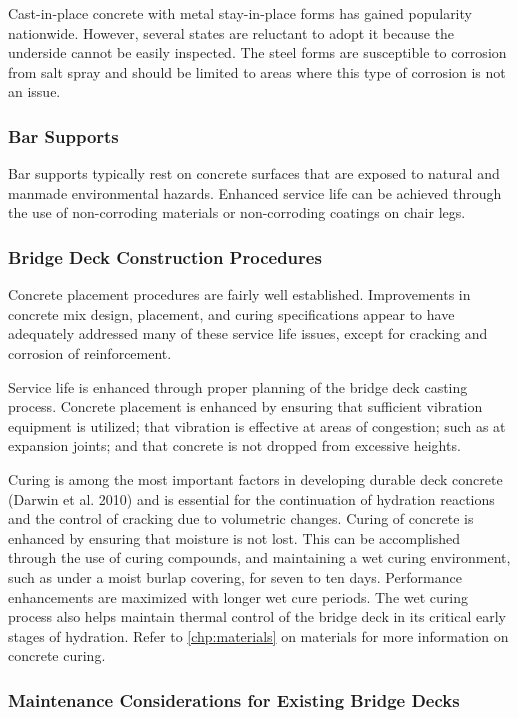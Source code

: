Cast-in-place concrete with metal stay-in-place forms has gained popularity nationwide. However, several states are reluctant to adopt it because the underside cannot be easily inspected. The steel forms are susceptible to corrosion from salt spray and should be limited to areas where this type of corrosion is not an issue.


\subsubsection{Bar Supports}
Bar supports typically rest on concrete surfaces that are exposed to natural and manmade environmental hazards.  Enhanced service life can be achieved through the use of non-corroding materials or non-corroding coatings on chair legs.


\subsubsection{Bridge Deck Construction Procedures}
Concrete placement procedures are fairly well established. Improvements in concrete mix design, placement, and curing specifications appear to have adequately addressed many of these service life issues, except for cracking and corrosion of reinforcement.

Service life is enhanced through proper planning of the bridge deck casting process. Concrete placement is enhanced by ensuring that sufficient vibration equipment is utilized; that vibration is effective at areas of congestion; such as at expansion joints; and that concrete is not dropped from excessive heights.

Curing is among the most important factors in developing durable deck concrete (Darwin et al. 2010) and is essential for the continuation of hydration reactions and the control of cracking due to volumetric changes. Curing of concrete is enhanced by ensuring that moisture is not lost. This can be accomplished through the use of curing compounds, and maintaining a wet curing environment, such as under a moist burlap covering, for seven to ten days.  Performance enhancements are maximized with longer wet cure periods. The wet curing process also helps maintain thermal control of the bridge deck in its critical early stages of hydration. Refer to \cref{chp:materials} on materials for more information on concrete curing.

\subsubsection{Maintenance Considerations for Existing Bridge Decks}

